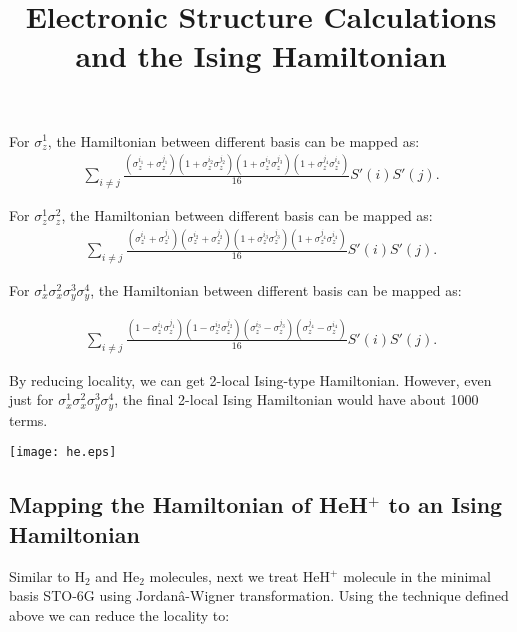 \documentclass{article}
\newcommand\x[1]{\sigma_x^{#1}}
\newcommand\y[1]{\sigma_y^{#1}}
\newcommand\z[1]{\sigma_z^{#1}}\title{Electronic Structure Calculations and the Ising Hamiltonian}
\begin{document}
For $\z{1}$, the Hamiltonian between different basis can be mapped as:
\begin{equation}
\begin{aligned}
\sum_{i \neq j}\frac{(\z{i_1}+\z{j_1})(1+\z{i_2}\z{j_2})(1+\z{i_3}\z{j_3})(1+\z{j_4}\z{i_4})}{16}S'(i)S'(j) .
\end{aligned}
\end{equation}

For $\z{1}\z{2}$, the Hamiltonian between different basis can be mapped as:
\begin{equation}
\begin{aligned}
\sum_{i \neq j}\frac{(\z{i_1}+\z{j_1})(\z{i_2}+\z{j_2})(1+\z{i_3}\z{j_3})(1+\z{j_4}\z{i_4})}{16}S'(i)S'(j) .
\end{aligned}
\end{equation}

For $\x{1}\x{2}\y{3}\y{4}$, the Hamiltonian between different basis can be mapped as:

\begin{equation}
\begin{aligned}
\sum_{i \neq j}\frac{(1-\z{i_1}\z{j_1})(1-\z{i_2}\z{j_2})(\z{i_3}-\z{j_3})(\z{j_4}-\z{i_4})}{16}S'(i)S'(j) .
\end{aligned}
\end{equation}

By reducing locality, we can get 2-local Ising-type Hamiltonian. However, even just for $\x{1}\x{2}\y{3}\y{4}$, the final 2-local Ising Hamiltonian would have about 1000 terms. 

\begin{center}
\texttt{[image: he.eps]}
\end{center}

\subsection*{Mapping the Hamiltonian of HeH$^+$ to an Ising Hamiltonian}

Similar to H$_2$ and He$_2$ molecules, next we treat HeH$^+$ molecule in the minimal basis STO-6G using Jordanâ-Wigner transformation. Using the technique defined above \cite{moll2016optimizing} we can reduce the locality to:
\end{document}
